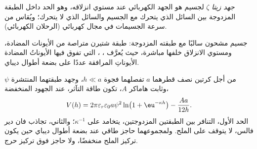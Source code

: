 \begin{definition}\label{def:b3:colloids:zeta}
\emph{جهد زيتا} $\zeta$ لجسيم هو الجهد
الكهربائي عند مستوي انزلاقه، وهو الحد داخل الطبقة المزدوجة بين
السائل الذي يتحرك مع الجسيم والسائل الذي لا يتحرك؛ ويُقاس
من سرعة الجسيمات في مجال كهربائي
(الرحلان الكهربائي).
\end{definition}

\begin{omfigure}

{\small جسيم مشحون سالبًا مع طبقته المزدوجة: طبقة شتيرن متراصة
من الأيونات المضادة، ومستوي الانزلاق خلفها مباشرة، حيث يُعرَّف ، ، التي تفوق فيها الأيوناتُ المضادة
الأيوناتِ المرافقة عددًا على بضعة أطوال ديباي.}
\end{omfigure}

\begin{theorem}\label{thm:b3:colloids:dlvo}
من أجل كرتين نصف قطرهما $a$ تفصلهما فجوة $h \ll a$، وجهد طبقتهما المنتشرة
$\psi$ وثابت هاماكر $A$، تكون طاقة التآثر، عند الجهود المنخفضة،
\[
  V(h) = 2\pi\varepsilon_r\varepsilon_0a\psi^2\ln\bigl(1 + \eu^{-\kappa h}\bigr) - \frac{Aa}{12h} .
\]
الحد الأول، التنافر بين الطبقتين المزدوجتين، يتخامد على  $\kappa^{-1}$؛
والثاني، تجاذب فان دير فالس، لا يتوقف على الملح. ولمجموعهما
حاجز طاقي عند بضعة أطوال ديباي حين يكون تركيز الملح
منخفضًا، ولا حاجز فوق تركيز حرج.
\end{theorem}

